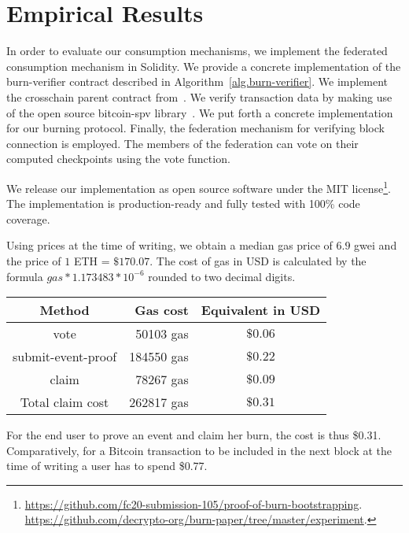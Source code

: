 \section{Empirical Results}
In order to evaluate our consumption mechanisms, we implement the federated consumption mechanism in Solidity. We provide a concrete implementation of the \textsf{burn-verifier} contract described in Algorithm~\ref{alg.burn-verifier}. We implement the \textsf{crosschain} parent contract from~\cite{pow-sidechains}. We verify transaction data by making use of the open source bitcoin-spv library~\cite{bitcoin-spv-library}. We put forth a concrete implementation for our burning protocol. Finally, the federation mechanism for verifying block connection is employed. The members of the federation can vote on their computed checkpoints using the \textsf{vote} function.

We release our implementation as open source software under the MIT license\footnote{
    \ifanonymous
        \url{https://github.com/fc20-submission-105/proof-of-burn-bootstrapping}.
    \else
        \url{https://github.com/decrypto-org/burn-paper/tree/master/experiment}.
    \fi
}.
The implementation is production-ready and fully tested with 100\% code coverage.

Using prices at the time of writing, we obtain a median gas price of $6.9$ gwei and the price of $1$ ETH = $\$170.07$. The cost of gas in USD is calculated by the formula $gas * 1.173483 * 10^{-6}$ rounded to two decimal digits.

\begin{center}
    \begin{tabular}{ |c|r|c| }
     \hline
     Method & Gas cost & Equivalent in USD \\
     \hline
     \textsf{vote}                  & 50103 gas  & $\$0.06$ \\
     \hline
     \textsf{submit-event-proof}    & 184550 gas & $\$0.22$ \\
     \textsf{claim}                 & 78267 gas  & $\$0.09$ \\
     Total claim cost               & 262817 gas & $\$0.31$ \\
     \hline
    \end{tabular}
\end{center}

For the end user to prove an event and claim her burn, the cost is thus \$0.31. Comparatively, for a Bitcoin transaction to be included in the next block at the time of writing a user has to spend \$0.77.
